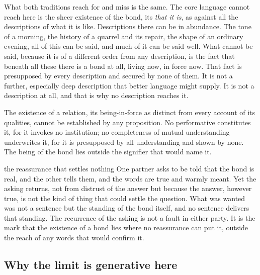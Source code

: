 What both traditions reach for and miss is the same. The core language cannot reach here is the sheer existence of the bond, its \emph{that it is}, as against all the descriptions of what it is like. Descriptions there can be in abundance. The tone of a morning, the history of a quarrel and its repair, the shape of an ordinary evening, all of this can be said, and much of it can be said well. What cannot be said, because it is of a different order from any description, is the fact that beneath all these there is a bond at all, living now, in force now. That fact is presupposed by every description and secured by none of them. It is not a further, especially deep description that better language might supply. It is not a description at all, and that is why no description reaches it.

\begin{claim}
The existence of a relation, its being-in-force as distinct from every account of its qualities, cannot be established by any proposition. No performative constitutes it, for it invokes no institution; no completeness of mutual understanding underwrites it, for it is presupposed by all understanding and shown by none. The being of the bond lies outside the signifier that would name it.
\end{claim}

\begin{casebox}{the reassurance that settles nothing}
One partner asks to be told that the bond is real, and the other tells them, and the words are true and warmly meant. Yet the asking returns, not from distrust of the answer but because the answer, however true, is not the kind of thing that could settle the question. What was wanted was not a sentence but the standing of the bond itself, and no sentence delivers that standing. The recurrence of the asking is not a fault in either party. It is the mark that the existence of a bond lies where no reassurance can put it, outside the reach of any words that would confirm it.
\end{casebox}

\subsection*{Why the limit is generative here}

